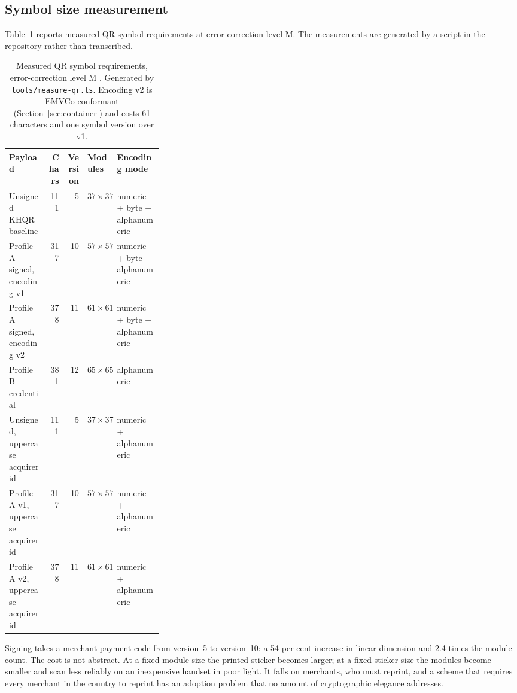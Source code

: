\documentclass[10pt,a4paper,twocolumn]{article}
\newcommand{\code}[1]{\texttt{\small #1}}
\newenvironment{widetable}{\begin{table}[t]}{\end{table}}
\newenvironment{widetable}{\begin{table}[t]}{\end{table}}
\begin{document}
\subsection{Symbol size measurement}
\label{sec:measurement}

Table~\ref{tab:qr} reports measured QR symbol requirements at error-correction
level M. The measurements are generated by a script in the repository rather
than transcribed.

\begin{widetable}
\centering
\small
\begin{tabular}{@{}lrrlp{0.3\linewidth}@{}}
\toprule
\textbf{Payload} & \textbf{Chars} & \textbf{Version} & \textbf{Modules} & \textbf{Encoding mode} \\
\midrule
Unsigned KHQR baseline        & 111 &  5 & $37\times37$ & numeric + byte + alphanumeric \\
Profile A signed, encoding v1 & 317 & 10 & $57\times57$ & numeric + byte + alphanumeric \\
Profile A signed, encoding v2 & 378 & 11 & $61\times61$ & numeric + byte + alphanumeric \\
Profile B credential          & 381 & 12 & $65\times65$ & alphanumeric \\
\addlinespace
Unsigned, uppercase acquirer id & 111 &  5 & $37\times37$ & numeric + alphanumeric \\
Profile A v1, uppercase acquirer id & 317 & 10 & $57\times57$ & numeric + alphanumeric \\
Profile A v2, uppercase acquirer id & 378 & 11 & $61\times61$ & numeric + alphanumeric \\
\bottomrule
\end{tabular}
\caption{Measured QR symbol requirements, error-correction level M
\citep{iso18004}. Generated by \code{tools/measure-qr.ts}. Encoding v2 is
EMVCo-conformant (Section~\ref{sec:container}) and costs 61 characters and one
symbol version over v1.}
\label{tab:qr}
\end{widetable}

Signing takes a merchant payment code from version~5 to version~10: a 54 per
cent increase in linear dimension and 2.4 times the module count. The cost is
not abstract. At a fixed module size the printed sticker becomes larger; at a
fixed sticker size the modules become smaller and scan less reliably on an
inexpensive handset in poor light. It falls on merchants, who must reprint, and
a scheme that requires every merchant in the country to reprint has an adoption
problem that no amount of cryptographic elegance addresses.
\end{document}
